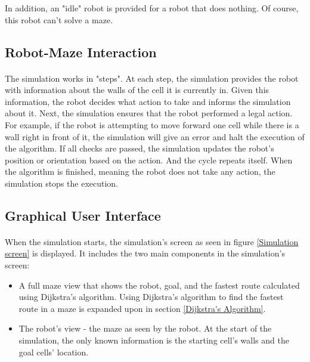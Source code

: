 \documentclass[12pt]{article}
\begin{document}
In addition, an "idle" robot is provided for a robot that does nothing.
Of course, this robot can't solve a \gls{maze}.

\subsection{Robot-Maze Interaction}
\paragraph{}
The simulation works in "steps".
At each step, the simulation provides the robot with information about the walls of the \gls{cell} it is currently in.
Given this information, the robot decides what action to take and informs the simulation about it.
Next, the simulation ensures that the robot performed a legal action.
For example, if the robot is attempting to move forward one \gls{cell} while there is a wall right in front of it, the simulation will give an error and halt the execution of the algorithm.
If all checks are passed, the simulation updates the robot's position or orientation based on the action.
And the cycle repeats itself.
When the algorithm is finished, meaning the robot does not take any action, the simulation stops the execution.

\subsection{Graphical User Interface}


\paragraph{}
When the simulation starts, the simulation's screen as seen in figure \ref{Simulation screen} is displayed.
It includes the two main components in the simulation's screen:
\begin{itemize}
    \item A full \gls{maze} view that shows the robot, goal, and the fastest route calculated using Dijkstra's algorithm. Using Dijkstra's algorithm to find the fastest route in a \gls{maze} is expanded upon in section \ref{Dijkstra's Algorithm}.
    \item The robot's view - the \gls{maze} as seen by the robot. At the start of the simulation, the only known information is the starting \gls{cell}'s walls and the goal \gls{cell}s' location.
\end{itemize}
\end{document}
